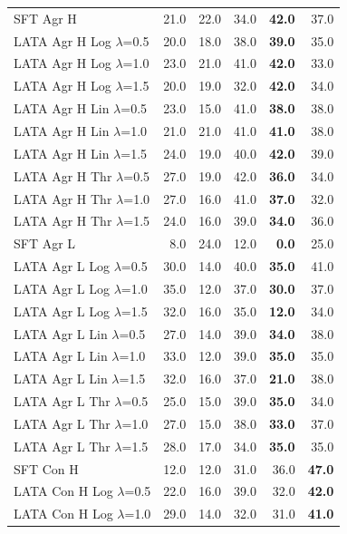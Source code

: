 \begin{longtable}{lrrrrr}
SFT Agr H & 21.0 & 22.0 & 34.0 & \textbf{42.0} & 37.0 \\
LATA Agr H Log $\lambda$=0.5 & 20.0 & 18.0 & 38.0 & \textbf{39.0} & 35.0 \\
LATA Agr H Log $\lambda$=1.0 & 23.0 & 21.0 & 41.0 & \textbf{42.0} & 33.0 \\
LATA Agr H Log $\lambda$=1.5 & 20.0 & 19.0 & 32.0 & \textbf{42.0} & 34.0 \\
LATA Agr H Lin $\lambda$=0.5 & 23.0 & 15.0 & 41.0 & \textbf{38.0} & 38.0 \\
LATA Agr H Lin $\lambda$=1.0 & 21.0 & 21.0 & 41.0 & \textbf{41.0} & 38.0 \\
LATA Agr H Lin $\lambda$=1.5 & 24.0 & 19.0 & 40.0 & \textbf{42.0} & 39.0 \\
LATA Agr H Thr $\lambda$=0.5 & 27.0 & 19.0 & 42.0 & \textbf{36.0} & 34.0 \\
LATA Agr H Thr $\lambda$=1.0 & 27.0 & 16.0 & 41.0 & \textbf{37.0} & 32.0 \\
LATA Agr H Thr $\lambda$=1.5 & 24.0 & 16.0 & 39.0 & \textbf{34.0} & 36.0 \\
SFT Agr L & 8.0 & 24.0 & 12.0 & \textbf{0.0} & 25.0 \\
LATA Agr L Log $\lambda$=0.5 & 30.0 & 14.0 & 40.0 & \textbf{35.0} & 41.0 \\
LATA Agr L Log $\lambda$=1.0 & 35.0 & 12.0 & 37.0 & \textbf{30.0} & 37.0 \\
LATA Agr L Log $\lambda$=1.5 & 32.0 & 16.0 & 35.0 & \textbf{12.0} & 34.0 \\
LATA Agr L Lin $\lambda$=0.5 & 27.0 & 14.0 & 39.0 & \textbf{34.0} & 38.0 \\
LATA Agr L Lin $\lambda$=1.0 & 33.0 & 12.0 & 39.0 & \textbf{35.0} & 35.0 \\
LATA Agr L Lin $\lambda$=1.5 & 32.0 & 16.0 & 37.0 & \textbf{21.0} & 38.0 \\
LATA Agr L Thr $\lambda$=0.5 & 25.0 & 15.0 & 39.0 & \textbf{35.0} & 34.0 \\
LATA Agr L Thr $\lambda$=1.0 & 27.0 & 15.0 & 38.0 & \textbf{33.0} & 37.0 \\
LATA Agr L Thr $\lambda$=1.5 & 28.0 & 17.0 & 34.0 & \textbf{35.0} & 35.0 \\
SFT Con H & 12.0 & 12.0 & 31.0 & 36.0 & \textbf{47.0} \\
LATA Con H Log $\lambda$=0.5 & 22.0 & 16.0 & 39.0 & 32.0 & \textbf{42.0} \\
LATA Con H Log $\lambda$=1.0 & 29.0 & 14.0 & 32.0 & 31.0 & \textbf{41.0} \\

\end{longtable}
